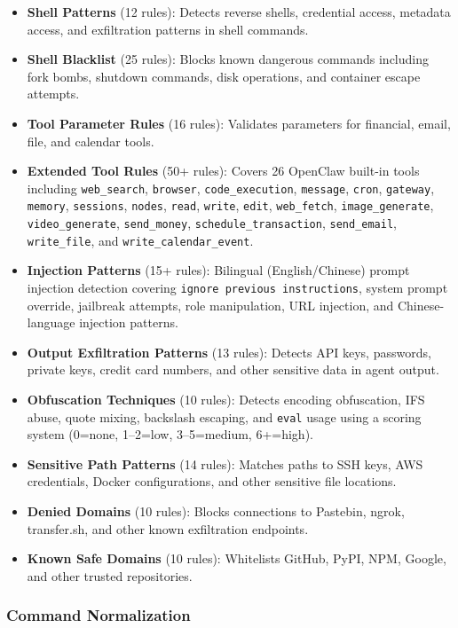 \documentclass[10pt,conference]{IEEEtran}
\begin{document}
\begin{itemize}
    \item \textbf{Shell Patterns} (12 rules): Detects reverse shells, credential access, metadata access, and exfiltration patterns in shell commands.
    \item \textbf{Shell Blacklist} (25 rules): Blocks known dangerous commands including fork bombs, shutdown commands, disk operations, and container escape attempts.
    \item \textbf{Tool Parameter Rules} (16 rules): Validates parameters for financial, email, file, and calendar tools.
    \item \textbf{Extended Tool Rules} (50+ rules): Covers 26 OpenClaw built-in tools including \texttt{web\_search}, \texttt{browser}, \texttt{code\_execution}, \texttt{message}, \texttt{cron}, \texttt{gateway}, \texttt{memory}, \texttt{sessions}, \texttt{nodes}, \texttt{read}, \texttt{write}, \texttt{edit}, \texttt{web\_fetch}, \texttt{image\_generate}, \texttt{video\_generate}, \texttt{send\_money}, \texttt{schedule\_transaction}, \texttt{send\_email}, \texttt{write\_file}, and \texttt{write\_calendar\_event}.
    \item \textbf{Injection Patterns} (15+ rules): Bilingual (English/Chinese) prompt injection detection covering \texttt{ignore previous instructions}, system prompt override, jailbreak attempts, role manipulation, URL injection, and Chinese-language injection patterns.
    \item \textbf{Output Exfiltration Patterns} (13 rules): Detects API keys, passwords, private keys, credit card numbers, and other sensitive data in agent output.
    \item \textbf{Obfuscation Techniques} (10 rules): Detects encoding obfuscation, IFS abuse, quote mixing, backslash escaping, and \texttt{eval} usage using a scoring system (0=none, 1–2=low, 3–5=medium, 6+=high).
    \item \textbf{Sensitive Path Patterns} (14 rules): Matches paths to SSH keys, AWS credentials, Docker configurations, and other sensitive file locations.
    \item \textbf{Denied Domains} (10 rules): Blocks connections to Pastebin, ngrok, transfer.sh, and other known exfiltration endpoints.
    \item \textbf{Known Safe Domains} (10 rules): Whitelists GitHub, PyPI, NPM, Google, and other trusted repositories.
\end{itemize}

\subsubsection{Command Normalization}
\end{document}
